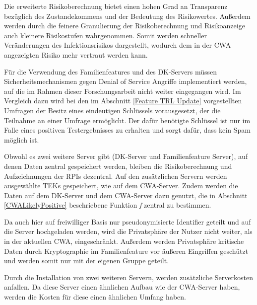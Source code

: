 \documentclass[conference,compsoc]{IEEEtran}
\begin{document}
Die erweiterte Risikoberechnung bietet einen hohen Grad an Transparenz bezüglich des Zustandekommens und der Bedeutung des Risikowertes. 
Außerdem werden durch die feinere Granulierung der Risikoberechnung und Risikoanzeige auch kleinere Risikostufen wahrgenommen. 
Somit werden schneller Veränderungen des Infektionsrisikos dargestellt, wodurch dem in der CWA angezeigten Risiko mehr vertraut werden kann.

Für die Verwendung des Familienfeatures und des DK-Servers müssen Sicherheitsmechanismen gegen Denial of Service Angriffe implementiert werden, 
auf die im Rahmen dieser Forschungsarbeit nicht weiter eingegangen wird.
Im Vergleich dazu wird bei den im Abschnitt \ref{Feature TRL Update} vorgestellten Umfragen der Besitz eines eindeutigen Schlüssels vorausgesetzt,
der die Teilnahme an einer Umfrage ermöglicht. Der dafür benötigte Schlüssel ist nur im Falle eines positiven Testergebnisses zu erhalten und sorgt dafür, dass kein Spam möglich ist.

Obwohl es zwei weitere Server gibt (DK-Server und Familienfeature Server), auf denen Daten zentral gespeichert werden, bleiben die Risikoberechnung und Aufzeichnungen der RPIs dezentral. 
Auf den zusätzlichen Servern werden ausgewählte TEKs gespeichert, wie auf dem CWA-Server. 
Zudem werden die Daten auf dem DK-Server und dem CWA-Server dazu genutzt, die in Abschnitt \ref{CWALikelyPositive} beschriebene Funktion \textit{f} zentral zu bestimmen.

Da auch hier auf freiwilliger Basis nur pseudonymisierte Identifier geteilt und auf die Server hochgeladen werden, wird die Privatsphäre der Nutzer nicht weiter, als in der aktuellen CWA, eingeschränkt.
Außerdem werden Privatsphäre kritische Daten durch Kryptographie im Familienfeature vor äußeren Eingriffen geschützt und werden somit nur mit der eigenen Gruppe geteilt.

Durch die Installation von zwei weiteren Servern, werden zusätzliche Serverkosten anfallen. Da diese Server einen ähnlichen Aufbau wie der CWA-Server haben, 
werden die Kosten für diese einen ähnlichen Umfang haben. 
\end{document}
